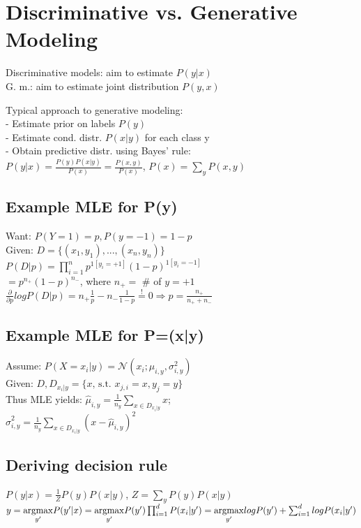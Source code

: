 \section*{Discriminative vs. Generative Modeling}
Discriminative models: aim to estimate $P(y|x)$\\
G. m.:  aim to estimate joint distribution $P(y,x)$

Typical approach to generative modeling:\\
- Estimate prior on labels $P(y)$\\
- Estimate cond. distr. $P(x|y)$ for each class y\\
- Obtain predictive distr. using Bayes' rule:\\
$P(y|x) = \frac{P(y) P(x|y)}{P(x)} = \frac{P(x,y)}{P(x)}$, $P(x) = \sum_y P(x,y)$


\subsection*{Example MLE for P(y)}
Want: $P(Y=1) = p, P(y=-1) = 1-p$\\
Given: $D=\{(x_1,y_1),...,(x_n,y_n)\}$\\
$P(D|p) = \prod_{i=1}^n p^{1[y_i=+1]} (1-p)^{1[y_i=-1]}$\\
$=p^{n_+} (1-p)^{n_-}$, where $n_+ = $ \# of $y=+1$\\
$\frac{\partial}{\partial p} log P(D|p) = n_+ \frac{1}{p} - n_- \frac{1}{1-p} \overset{!}{=} 0 \Rightarrow p=\frac{n_+}{n_+ + n_-}$

\subsection*{Example MLE for P=(x|y)}
Assume: $P(X=x_i|y) = \mathcal{N}(x_i;\mu_{i,y}, \sigma_{i,y}^2)$\\
Given: $D, D_{x_i|y} = \{x \text{, s.t. } x_{j,i}=x, y_j=y\}$\\
Thus MLE yields:
$\hat{\mu}_{i,y} = \frac{1}{n_y} \sum_{x\in D_{x_i|y}} x$;\\ %
$\hat{\sigma}_{i,y}^2 = \frac{1}{n_y} \sum_{x\in D_{x_i|y}} (x-\hat{\mu}_{i,y})^2$

\subsection*{Deriving decision rule}
$P(y|x) = \frac{1}{Z} P(y)P(x|y)$, $Z = \sum_y P(y) P(x|y)$\\
$y = \underset{y'}{\operatorname{argmax}} P(y'|x) = \underset{y'}{\operatorname{argmax}} P(y') \prod_{i=1}^d P(x_i|y')\\
= \underset{y'}{\operatorname{argmax}} log P(y') + \sum_{i=1}^d log P(x_i|y')$

